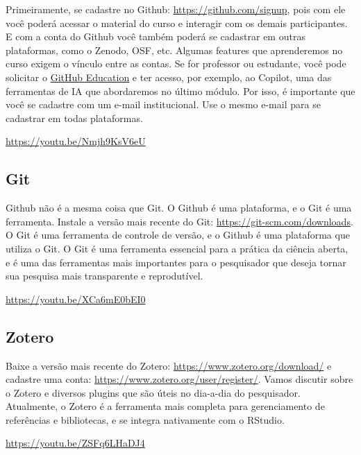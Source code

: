 \documentclass[
  a4paper,
]{article}
\begin{document}

Primeiramente, se cadastre no Github: \url{https://github.com/signup},
pois com ele você poderá acessar o material do curso e interagir com os
demais participantes. E com a conta do Github você também poderá se
cadastrar em outras plataformas, como o Zenodo, OSF, etc. Algumas
features que aprenderemos no curso exigem o vínculo entre as contas. Se
for professor ou estudante, você pode solicitar o
\href{https://education.github.com/}{GitHub Education} e ter acesso, por
exemplo, ao Copilot, uma das ferramentas de IA que abordaremos no último
módulo. Por isso, é importante que você se cadastre com um e-mail
institucional. Use o mesmo e-mail para se cadastrar em todas
plataformas.

\url{https://youtu.be/Nmjh9KsV6eU}

\subsection*{Git}\label{sec-gitprework}


Github não é a mesma coisa que Git. O Github é uma plataforma, e o Git é
uma ferramenta. Instale a versão mais recente do Git:
\url{https://git-scm.com/downloads}. O Git é uma ferramenta de controle
de versão, e o Github é uma plataforma que utiliza o Git. O Git é uma
ferramenta essencial para a prática da ciência aberta, e é uma das
ferramentas mais importantes para o pesquisador que deseja tornar sua
pesquisa mais transparente e reprodutível.

\url{https://youtu.be/XCa6mE0bEI0}

\subsection*{Zotero}\label{sec-zoteroprework}


Baixe a versão mais recente do Zotero:
\url{https://www.zotero.org/download/} e cadastre uma conta:
\url{https://www.zotero.org/user/register/}. Vamos discutir sobre o
Zotero e diversos plugins que são úteis no dia-a-dia do pesquisador.
Atualmente, o Zotero é a ferramenta mais completa para gerenciamento de
referências e bibliotecas, e se integra nativamente com o RStudio.

\url{https://youtu.be/ZSFq6LHaDJ4}
\end{document}
